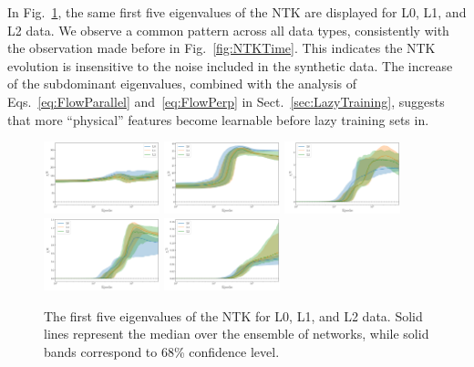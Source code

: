 \FloatBarrier

In Fig.~\ref{fig:EigvalsComparison}, the same first five eigenvalues of the NTK
are displayed for L0, L1, and L2 data. We observe a common pattern across all
data types, consistently with the observation made before in
Fig.~\ref{fig:NTKTime}. This indicates the NTK evolution is insensitive to
the noise included in the synthetic data. The increase of the subdominant
eigenvalues, combined with the analysis of Eqs.~\eqref{eq:FlowParallel}
and~\eqref{eq:FlowPerp} in Sect.~\ref{sec:LazyTraining}, suggests that 
more ``physical'' features become learnable before lazy training sets in.

\begin{figure}[ht]
  \centering
  \includegraphics[width=0.30\textwidth]{figs/section_3/ntk_eigvals_L0_L1_L2_n_1.pdf}
  \includegraphics[width=0.30\textwidth]{figs/section_3/ntk_eigvals_L0_L1_L2_n_2.pdf}
  \includegraphics[width=0.30\textwidth]{figs/section_3/ntk_eigvals_L0_L1_L2_n_3.pdf}
  \includegraphics[width=0.30\textwidth]{figs/section_3/ntk_eigvals_L0_L1_L2_n_4.pdf}
  \includegraphics[width=0.30\textwidth]{figs/section_3/ntk_eigvals_L0_L1_L2_n_5.pdf}
  \caption{The first five eigenvalues of the NTK for L0, L1, and L2 data. Solid
  lines represent the median over the ensemble of networks, while solid bands
  correspond to 68\% confidence level.}
  \label{fig:EigvalsComparison}
\end{figure}

